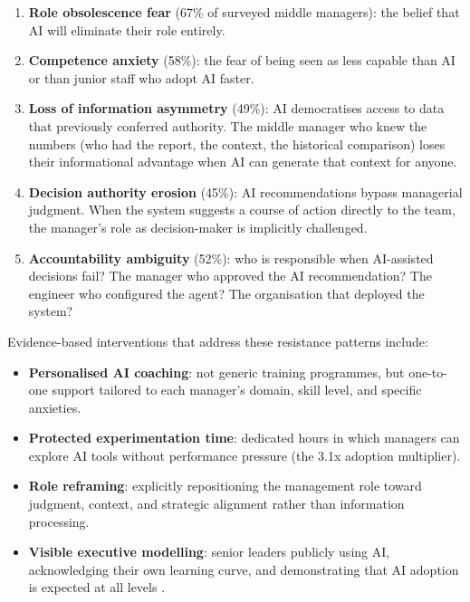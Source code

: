 \begin{enumerate}
  \item \textbf{Role obsolescence fear} (67\% of surveyed middle managers): the belief that AI will eliminate their role entirely.
  \item \textbf{Competence anxiety} (58\%): the fear of being seen as less capable than AI or than junior staff who adopt AI faster.
  \item \textbf{Loss of information asymmetry} (49\%): AI democratises access to data that previously conferred authority. The middle manager who knew the numbers (who had the report, the context, the historical comparison) loses their informational advantage when AI can generate that context for anyone.
  \item \textbf{Decision authority erosion} (45\%): AI recommendations bypass managerial judgment. When the system suggests a course of action directly to the team, the manager's role as decision-maker is implicitly challenged.
  \item \textbf{Accountability ambiguity} (52\%): who is responsible when AI-assisted decisions fail? The manager who approved the AI recommendation? The engineer who configured the agent? The organisation that deployed the system?
\end{enumerate}

\begin{cautionbox}[title={Effective Interventions}]
Evidence-based interventions that address these resistance patterns include:
\begin{itemize}
  \item \textbf{Personalised AI coaching}: not generic training programmes, but one-to-one support tailored to each manager's domain, skill level, and specific anxieties.
  \item \textbf{Protected experimentation time}: dedicated hours in which managers can explore AI tools without performance pressure (the 3.1x adoption multiplier).
  \item \textbf{Role reframing}: explicitly repositioning the management role toward judgment, context, and strategic alignment rather than information processing.
  \item \textbf{Visible executive modelling}: senior leaders publicly using AI, acknowledging their own learning curve, and demonstrating that AI adoption is expected at all levels \parencite{Mollick2025Management}.
\end{itemize}
\end{cautionbox}

